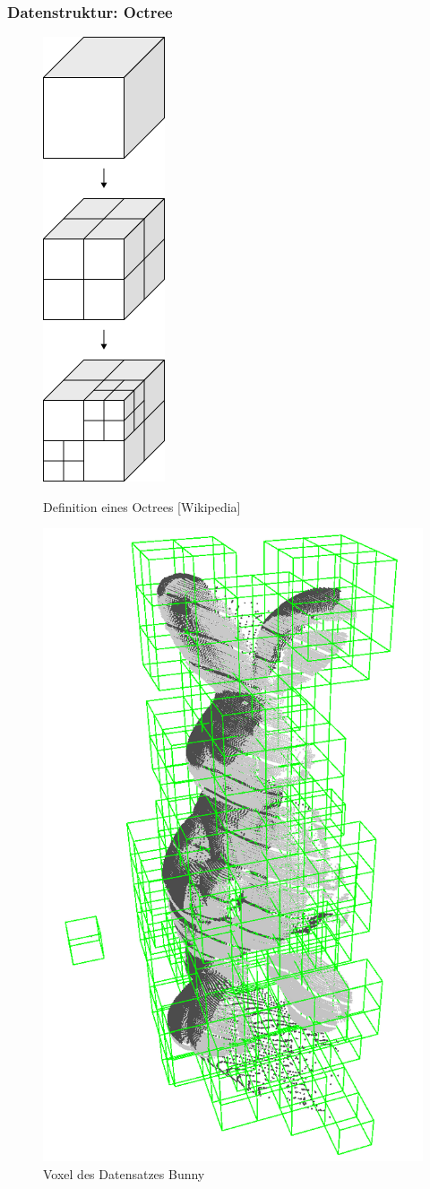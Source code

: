 \documentclass[presentation]{beamer}
\begin{document}
\begin{frame}
\frametitle{Datenstruktur: Octree}

\begin{figure} 
	\centering
	\begin{minipage}{.45\textwidth} 
		\centering
		\includegraphics[width=0.2\linewidth]{figures/Octree1}
		\caption{Definition eines Octrees [Wikipedia]}
		\label{fig:bunnyOctree}
	\end{minipage}
	\centering
	\begin{minipage}{.45\textwidth} 
		\centering
		\includegraphics[width=0.5\linewidth]{figures/bunny/bunny_voxel.png}
		\caption{Voxel des Datensatzes Bunny}
		\label{fig:bunnyVoxels}
	\end{minipage}
	\label{fig:octree}
\end{figure}


\end{frame}
\end{document}
